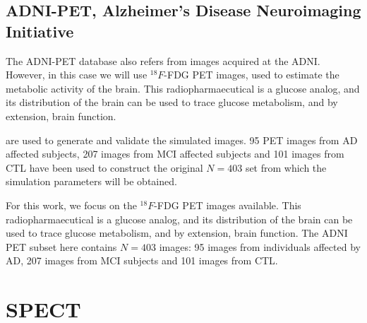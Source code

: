 \subsection{ADNI-PET, Alzheimer's Disease Neuroimaging Initiative}\label{sec:adnipet}
The ADNI-PET database also refers from images acquired at the \ac{ADNI}. However, in this case we will use $^{18}F$-FDG \ac{PET} images, used to estimate the metabolic activity of the brain. This radiopharmaecutical is a glucose analog, and its distribution of the brain can be used to trace glucose metabolism, and by extension, brain function. 




are used to generate and validate the simulated images. 95 \ac{PET} images from \ac{AD} affected subjects,  207 images from \ac{MCI} affected subjects and 101 images from \ac{CTL} have been used to construct the original $N=403$ set from which the simulation parameters will be obtained. 


For this work, we focus on the $^{18}F$-FDG \ac{PET} images available. This radiopharmaecutical is a glucose analog, and its distribution of the brain can be used to trace glucose metabolism, and by extension, brain function. The \ac{ADNI} \ac{PET} subset here contains $N=403$ images: 95 images from individuals affected by  \ac{AD}, 207 images from \ac{MCI} subjects and 101 images from  \ac{CTL}. 

\section{\acs{SPECT}}

